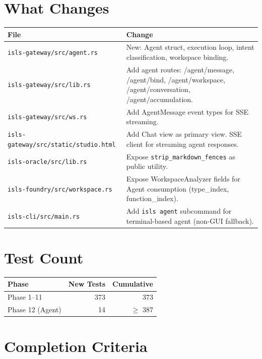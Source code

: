 \documentclass[11pt,a4paper,twoside]{article}
\theoremstyle{definition}
\theoremstyle{remark}
\begin{document}
\section{What Changes}

\begin{tabularx}{\textwidth}{l X}
\toprule
\textbf{File} & \textbf{Change} \\
\midrule
\texttt{isls-gateway/src/agent.rs} & New: Agent struct, execution loop,
  intent classification, workspace binding. \\
\texttt{isls-gateway/src/lib.rs} & Add agent routes: /agent/message,
  /agent/bind, /agent/workspace, /agent/conversation,
  /agent/accumulation. \\
\texttt{isls-gateway/src/ws.rs} & Add AgentMessage event types for
  SSE streaming. \\
\texttt{isls-gateway/src/static/studio.html} & Add Chat view as
  primary view. SSE client for streaming agent responses. \\
\texttt{isls-oracle/src/lib.rs} & Expose \texttt{strip\_markdown\_fences}
  as public utility. \\
\texttt{isls-foundry/src/workspace.rs} & Expose WorkspaceAnalyzer
  fields for Agent consumption (type\_index, function\_index). \\
\texttt{isls-cli/src/main.rs} & Add \texttt{isls agent} subcommand
  for terminal-based agent (non-GUI fallback). \\
\bottomrule
\end{tabularx}

\section{Test Count}

\begin{tabular}{l r r}
\toprule
\textbf{Phase} & \textbf{New Tests} & \textbf{Cumulative} \\
\midrule
Phase 1--11 & 373 & 373 \\
Phase 12 (Agent) & 14 & $\ge$ 387 \\
\bottomrule
\end{tabular}

\section{Completion Criteria}
\end{document}
